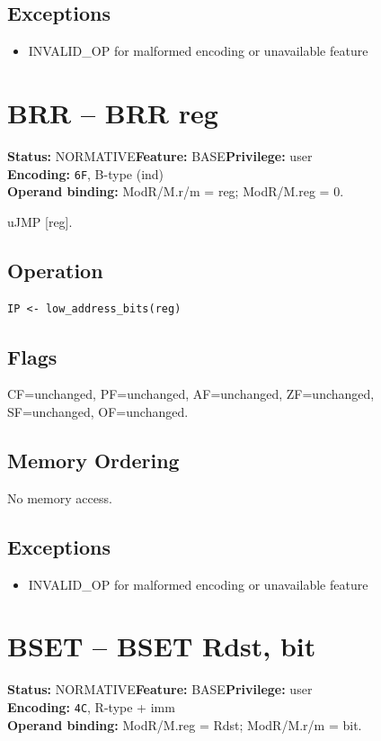 \documentclass[10pt]{article}
\begin{document}
\subsection*{Exceptions}
\begin{itemize}
\item INVALID\_OP for malformed encoding or unavailable feature
\end{itemize}
\clearpage

\section{BRR -- BRR reg}
\textbf{Status:} NORMATIVE\quad \textbf{Feature:} BASE\quad \textbf{Privilege:} user\\
\textbf{Encoding:} \texttt{6F}, B-type (ind)\\
\textbf{Operand binding:} ModR/M.r/m = reg; ModR/M.reg = 0.

uJMP [reg].

\subsection*{Operation}
\begin{lstlisting}
IP <- low_address_bits(reg)
\end{lstlisting}
\subsection*{Flags}
CF=unchanged, PF=unchanged, AF=unchanged, ZF=unchanged, SF=unchanged, OF=unchanged.
\subsection*{Memory Ordering}
No memory access.
\subsection*{Exceptions}
\begin{itemize}
\item INVALID\_OP for malformed encoding or unavailable feature
\end{itemize}
\clearpage

\section{BSET -- BSET Rdst, bit}
\textbf{Status:} NORMATIVE\quad \textbf{Feature:} BASE\quad \textbf{Privilege:} user\\
\textbf{Encoding:} \texttt{4C}, R-type + imm\\
\textbf{Operand binding:} ModR/M.reg = Rdst; ModR/M.r/m = bit.
\end{document}
